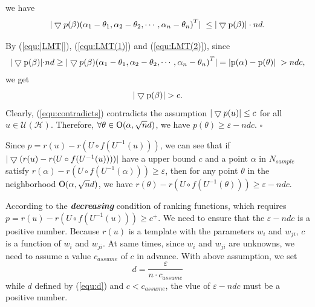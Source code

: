 we have
\begin{equation}\label{equ:LMT(2)}
{\rm{|}}\bigtriangledown p(\beta ){\left( {{\alpha _1} - {\theta _1},{\alpha _2} - {\theta _2}, \cdots ,{\alpha _n} - {\theta _n}} \right)^T}{\rm{|}}\; \le {\rm{ |\bigtriangledown p(}}\beta {\rm{)|}}\cdot nd.
\end{equation}

By (\ref{equ:|LMT|}), (\ref{equ:LMT(1)}) and (\ref{equ:LMT(2)}), since
\begin{equation}\label{equ:LMT(end)}
\begin{array}{l}
{\rm{|\bigtriangledown p(}}\beta {\rm{)|\cdot}}nd \ge {\rm{|}}\bigtriangledown p(\beta ){\left( {{\alpha _1} - {\theta _1},{\alpha _2} - {\theta _2}, \cdots ,{\alpha _n} - {\theta _n}} \right)^T}{\rm{|}}\;{\rm{ = {\rm{|}}p(}}\alpha {\rm{) - p(}}\theta {\rm{)|}}\; > ndc,
\end{array}
\end{equation}
we get
\begin{equation}\label{equ:contradicts}
{\rm{|\bigtriangledown p(}}\beta {\rm{)|}} > c.
\end{equation}
Clearly, (\ref{equ:contradicts}) contradicts the assumption ${\rm{|}}\bigtriangledown p(u)| \le c$ for all $u \in \mathcal{U(H)}$. 
Therefore, $\forall \theta  \in {\rm O}(\alpha ,\sqrt n d )$, we have $p(\theta ) \ge \varepsilon  - ndc$. $\square$

\begin{rem}
	Since $p = r(u) - r(U \circ f({U^{ - 1}}(u)))$, we can see that if ${\rm{|}}\bigtriangledown(r(u) - r(U \circ f({U^{ - 1}}(u))))|$ have a upper bound $c$ and a point $\alpha $ in $N_{sample}$ satisfy $r(\alpha) - r(U \circ f({U^{ - 1}}(\alpha))) \ge \varepsilon$, then for any point $\theta $ in the neighborhood ${\rm O}(\alpha ,\sqrt n d )$, we have $r(\theta) - r(U \circ f({U^{ - 1}}(\theta)))\ge \varepsilon-ndc$. 
\end{rem}

According to the \textbf{\emph{decreasing}} condition of ranking functions, which requires $p = r(u) - r(U \circ f({U^{ - 1}}(u))) \ge c^+$. We need to ensure that the $\varepsilon  - ndc$ is a positive number. Because $r(u)$ is a template with the parameters $w_i$ and $w_{ji}$, $c$ is a function of $w_i$ and $w_{ji}$. At same times, since $w_i$ and $w_{ji}$ are unknowns, we need to assume a value $c_{assume}$ of $c$ in advance. With above assumption, we set
\begin{equation}\label{equ:d}
d = \frac{\varepsilon }{{n\cdot{c_{assume}}}}
\end{equation}
while $d$ defined by (\ref{equ:d}) and $c < c_{assume}$, the vlue of $\varepsilon-ndc$ must be a positive number.


